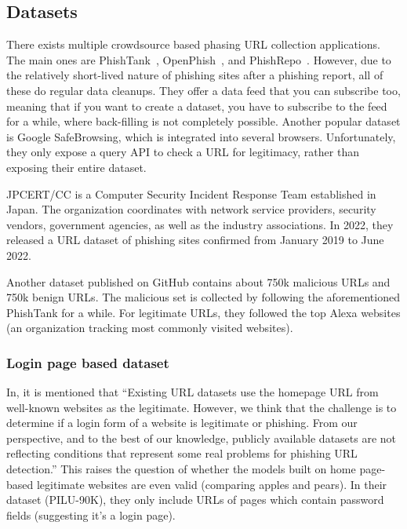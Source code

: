 \documentclass{article}
\begin{document}
    \subsection{Datasets}\label{subsec:datasets}

    There exists multiple crowdsource based phasing URL collection applications.
    The main ones are PhishTank~\cite{PhishTank}, OpenPhish~\cite{OpenPhish}, and PhishRepo~\cite{PhishRepo}.
    However, due to the relatively short-lived nature of phishing sites after a phishing report, all of these do regular data cleanups.
    They offer a data feed that you can subscribe too, meaning that if you want to create a dataset, you have to subscribe to the feed for a while, where back-filling is not completely possible.
    Another popular dataset is Google SafeBrowsing\cite{GoogleSafeBrowsing}, which is integrated into several browsers.
    Unfortunately, they only expose a query API to check a URL for legitimacy, rather than exposing their entire dataset.

    JPCERT/CC is a Computer Security Incident Response Team established in Japan.
    The organization coordinates with network service providers, security vendors, government agencies, as well as the industry associations\cite{JPCertCC}.
    In 2022, they released a URL dataset of phishing sites confirmed from January 2019 to June 2022\cite{JPCertCCDataset}.

    Another dataset published on GitHub contains about 750k malicious URLs and 750k benign URLs\cite{VisualizingRNNInURLDetection}.
    The malicious set is collected by following the aforementioned PhishTank for a while.
    For legitimate URLs, they followed the top Alexa websites (an organization tracking most commonly visited websites).

    \subsubsection{Login page based dataset}\label{subsubsec:login-page-based-dataset}
    In\cite{PhishingLoginURLDetection}, it is mentioned that ``Existing URL datasets use the homepage URL from well-known websites as the legitimate.
    However, we think that the challenge is to determine if a login form of a website is legitimate or phishing.
    From our perspective, and to the best of our knowledge, publicly available datasets are not reflecting conditions that represent some real problems for phishing URL detection.''
    This raises the question of whether the models built on home page-based legitimate websites are even valid (comparing apples and pears).
    In their dataset (PILU-90K), they only include URLs of pages which contain password fields (suggesting it's a login page).
\end{document}
